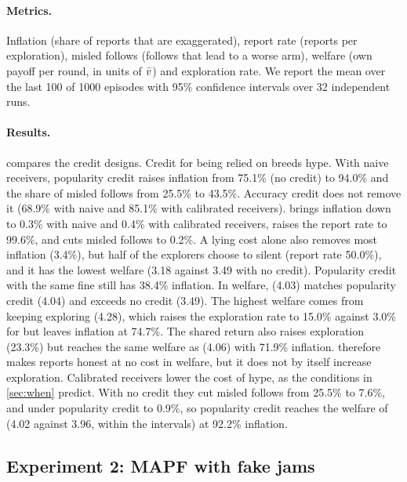 \paragraph{Metrics.}
Inflation (share of reports that are exaggerated), report rate (reports per exploration), misled follows (follows that lead to a worse arm), welfare (own payoff per round, in units of $\bar v$) and exploration rate. We report the mean over the last 100 of 1000 episodes with 95\% confidence intervals over 32 independent runs.

\paragraph{Results.}
 compares the credit designs. Credit for being relied on breeds hype. With naive receivers, popularity credit raises inflation from 75.1\% (no credit) to 94.0\% and the share of misled follows from 25.5\% to 43.5\%. Accuracy credit does not remove it (68.9\% with naive and 85.1\% with calibrated receivers). \tvc{} brings inflation down to 0.3\% with naive and 0.4\% with calibrated receivers, raises the report rate to 99.6\%, and cuts misled follows to 0.2\%. A lying cost alone also removes most inflation (3.4\%), but half of the explorers choose to silent (report rate 50.0\%), and it has the lowest welfare (3.18 against 3.49 with no credit). Popularity credit with the same fine still has 38.4\% inflation. In welfare, \tvc{} (4.03) matches popularity credit (4.04) and exceeds no credit (3.49). The highest welfare comes from keeping exploring (4.28), which raises the exploration rate to 15.0\% against 3.0\% for \tvc{} but leaves inflation at 74.7\%. The shared return also raises exploration (23.3\%) but reaches the same welfare as \tvc{} (4.06) with 71.9\% inflation. \tvc{} therefore makes reports honest at no cost in welfare, but it does not by itself increase exploration. Calibrated receivers lower the cost of hype, as the conditions in \cref{sec:when} predict. With no credit they cut misled follows from 25.5\% to 7.6\%, and under popularity credit to 0.9\%, so popularity credit reaches the welfare of \tvc{} (4.02 against 3.96, within the intervals) at 92.2\% inflation.



\subsection{Experiment 2: MAPF with fake jams} \label{subsec:experiment2}

